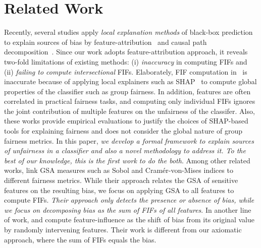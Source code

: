 \section{Related Work} Recently, several studies apply \emph{local explanation methods} of black-box prediction to explain sources of bias by feature-attribution~\cite{begley2020explainability,lundberg2020explaining} and causal path decomposition~\cite{pan2021explaining}. Since our work adopts feature-attribution approach, it reveals two-fold limitations of existing methods: (i) \emph{inaccuracy} in computing FIFs and (ii) \emph{failing to compute intersectional} FIFs. Elaborately, FIF computation in~\cite{begley2020explainability,lundberg2020explaining} is inaccurate because of applying local explainers such as SHAP~\cite{lundberg2017unified} to compute global properties of the classifier such as group fairness. In addition, features are often correlated in practical fairness tasks, and computing only individual FIFs ignores the joint contribution of multiple features on the unfairness of the classifer. Also, these works provide empirical evaluations to justify the choices of SHAP-based tools for explaining fairness and does not consider the global nature of group fairness metrics. In this paper, \textit{we develop a formal framework to explain sources of unfairness in a classifier and also a novel methodology to address it. To the best of our knowledge, this is the first work to do the both}. %
Among other related works, \cite{benesse2021fairness} link GSA measures such as Sobol and Cram{\'e}r-von-Mises indices to different fairness metrics. While their approach relates the GSA of sensitive features on the resulting bias, we focus on applying GSA to all features to compute FIFs. \textit{Their approach only detects the presence or absence of bias, while we focus on decomposing bias as the sum of FIFs of all features}. In another line of work, \cite{datta2016algorithmic} and \cite{ghosh2022algorithmic} compute feature-influence as the shift of bias from its original value by randomly intervening features. Their work is different from our axiomatic approach, where the sum of FIFs equals the bias.
